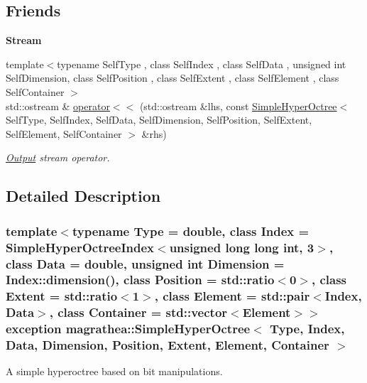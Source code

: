 \subsection*{Friends}
\begin{Indent}{\bf Stream}\par
\begin{DoxyCompactItemize}
\item 
{\footnotesize template$<$typename Self\-Type , class Self\-Index , class Self\-Data , unsigned int Self\-Dimension, class Self\-Position , class Self\-Extent , class Self\-Element , class Self\-Container $>$ }\\std\-::ostream \& \hyperlink{exceptionmagrathea_1_1SimpleHyperOctree_a79b6825c028327cb97bee79b3a61339b}{operator$<$$<$} (std\-::ostream \&lhs, const \hyperlink{exceptionmagrathea_1_1SimpleHyperOctree}{Simple\-Hyper\-Octree}$<$ Self\-Type, Self\-Index, Self\-Data, Self\-Dimension, Self\-Position, Self\-Extent, Self\-Element, Self\-Container $>$ \&rhs)
\begin{DoxyCompactList}\small\item\em \hyperlink{exceptionOutput}{Output} stream operator. \end{DoxyCompactList}\end{DoxyCompactItemize}
\end{Indent}


\subsection{Detailed Description}
\subsubsection*{template$<$typename Type = double, class Index = Simple\-Hyper\-Octree\-Index$<$unsigned long long int, 3$>$, class Data = double, unsigned int Dimension = Index\-::dimension(), class Position = std\-::ratio$<$0$>$, class Extent = std\-::ratio$<$1$>$, class Element = std\-::pair$<$\-Index, Data$>$, class Container = std\-::vector$<$\-Element$>$$>$exception magrathea\-::\-Simple\-Hyper\-Octree$<$ Type, Index, Data, Dimension, Position, Extent, Element, Container $>$}

A simple hyperoctree based on bit manipulations. 

